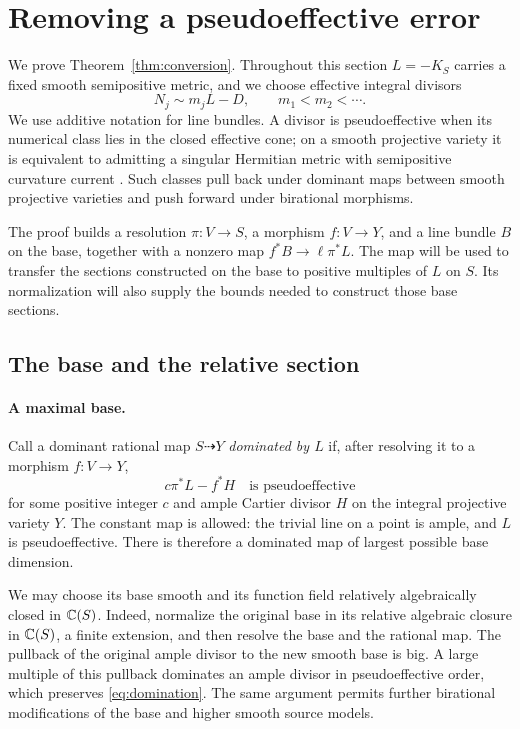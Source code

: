 \section{Removing a pseudoeffective error}
\label{sec:conversion}

We prove Theorem~\ref{thm:conversion}. Throughout this section
\(L=-K_S\) carries a fixed smooth semipositive metric, and we choose
effective integral divisors
\begin{equation}\label{eq:effective-sequence}
N_j\sim m_jL-D,\qquad m_1<m_2<\cdots.
\end{equation}
We use additive notation for line bundles. A divisor is pseudoeffective
when its numerical class lies in the closed effective cone; on a smooth projective variety
it is equivalent to admitting a singular Hermitian metric with
semipositive curvature current \cite{DPS2001}. Such classes pull back
under dominant maps between smooth projective varieties and push forward
under birational morphisms. 

The proof builds a resolution \(\pi:V\to S\), a morphism
\(f:V\to Y\), and a line bundle \(B\) on the base, together with
a nonzero map \(f^*B\to\ell\pi^*L\). The map will be used to transfer the
sections constructed on the base to positive multiples of \(L\) on
\(S\). Its normalization will also supply
the bounds needed to construct those base sections.

\subsection{The base and the relative section}

\paragraph{A maximal base.}
Call a dominant rational map \(S\dashrightarrow Y\) \emph{dominated
by \(L\)} if, after resolving it to a morphism \(f:V\to Y\),
\begin{equation}\label{eq:domination}
c\pi^*L-f^*H\quad\text{is pseudoeffective}
\end{equation}
for some positive integer \(c\) and ample Cartier divisor \(H\) on
the integral projective variety \(Y\). The constant map is allowed:
the trivial line on a point is ample, and \(L\) is pseudoeffective.
There is therefore a dominated map of largest possible base dimension.

We may choose its base smooth and its function field relatively
algebraically closed in \(\mathbb C(S)\). Indeed, normalize the original
base in its relative algebraic closure in \(\mathbb C(S)\), a finite
extension, and then resolve the base and the rational map. The pullback
of the original ample divisor to the new smooth base is big. A large
multiple of this pullback dominates an ample divisor in pseudoeffective
order, which preserves \eqref{eq:domination}. The same argument permits
further birational modifications of the base and higher smooth source
models.

